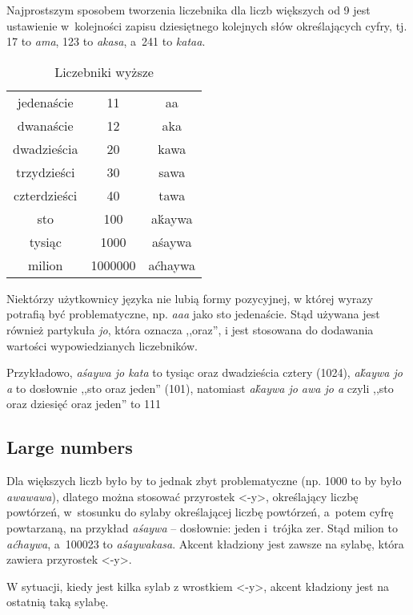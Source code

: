 Najprostszym sposobem tworzenia liczebnika dla liczb większych od 9 jest
ustawienie w~kolejności zapisu dziesiętnego kolejnych słów określających cyfry,
tj. 17 to \emph{ama}, 123 to \emph{akasa}, a~241 to \emph{kataa}.

\begin{table}[ht]
  \centering
  \caption{Liczebniki wyższe}
  \begin{tabular}{ccc} \toprule
    jedenaście   & 11      & aa      \\
    dwanaście    & 12      & aka     \\
    dwadzieścia  & 20      & kawa    \\
    trzydzieści  & 30      & sawa    \\
    czterdzieści & 40      & tawa    \\
    sto          & 100     & aḱaywa  \\
    tysiąc       & 1000    & aśaywa  \\
    milion       & 1000000 & aćhaywa \\\bottomrule
  \end{tabular}
  \label{tab:numerals2}
\end{table}

Niektórzy użytkownicy języka nie lubią formy pozycyjnej, w której wyrazy
potrafią być problematyczne, np. \emph{aaa} jako sto jedenaście. Stąd używana
jest również partykuła \emph{jo}, która oznacza ,,oraz'', i jest stosowana do
dodawania wartości wypowiedzianych liczebników.

Przykładowo, \emph{aśaywa jo kata} to tysiąc oraz dwadzieścia cztery (1024),
\emph{aḱaywa jo a} to dosłownie ,,sto oraz jeden'' (101), natomiast
\emph{aḱaywa jo awa jo a} czyli ,,sto oraz dziesięć oraz jeden'' to 111


\subsection{Large numbers}

Dla większych
liczb było by to jednak zbyt problematyczne (np. 1000 to by było
\emph{awawawa}), dlatego można stosować przyrostek <-y>, określający liczbę
powtórzeń, w~stosunku do sylaby określającej liczbę powtórzeń, a~potem cyfrę
powtarzaną, na przykład \emph{aśaywa} -- dosłownie: jeden i~trójka zer. Stąd
milion to \emph{aćhaywa}, a~100023 to \emph{aśaywakasa}. Akcent kładziony jest
zawsze na sylabę, która zawiera przyrostek <-y>.

W sytuacji, kiedy jest kilka sylab z wrostkiem <-y>, akcent kładziony jest na
ostatnią taką sylabę.



